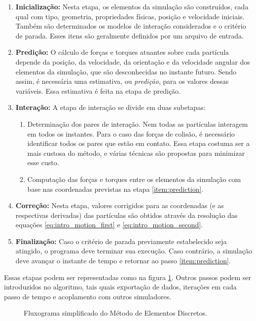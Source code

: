 \begin{enumerate} 
	\item \textbf{Inicialização:} Nesta etapa, os elementos da simulação são construídos, cada qual com tipo, geometria, propriedades físicas, posição e velocidade iniciais. Também são determinados os modelos de interação considerados e o critério de parada. Esses itens são geralmente definidos por um arquivo de entrada. 
	\item \textbf{Predição:} O cálculo de forças e torques atuantes sobre cada partícula depende da posição, da velocidade, da orientação e da velocidade angular dos elementos da simulação, que são desconhecidas no instante futuro. Sendo assim, é necessária uma estimativa, ou \textit{predição}, para os valores dessas variáveis. Essa estimativa é feita na etapa de predição. \label{item:prediction} 
	\item \textbf{Interação:} A etapa de interação se divide em duas subetapas: 
	\begin{enumerate} 
		\item Determinação dos pares de interação. Nem todas as partículas interagem em todos os instantes. Para o caso das forças de colisão, é necessário identificar todos os pares que estão em contato. Essa etapa costuma ser a mais custosa do método, e várias técnicas são propostas para minimizar esse custo. 
		\item Computação das forças e torques entre os elementos da simulação com base nas coordenadas previstas na etapa \ref{item:prediction}.
	\end{enumerate} 
	\item \textbf{Correção:} Nesta etapa, valores corrigidos para as coordenadas (e as respectivas derivadas) das partículas são obtidos através da resolução das equações \eqref{eq:intro_motion_first} e \eqref{eq:intro_motion_second}. 
	\item \textbf{Finalização:} Caso o critério de parada previamente estabelecido seja atingido, o programa deve terminar sua execução. Caso contrário, a simulação deve avançar o instante de tempo e retornar ao passo \ref{item:prediction}. 
\end{enumerate} 

Essas etapas podem ser representadas como na figura \ref{fig:simple_dem_algorithm}. Outros passos podem ser introduzidos no algoritmo, tais quais exportação de dados, iterações em cada passo de tempo e acoplamento com outros simuladores.

\begin{figure}[h]
	\caption{Fluxograma simplificado do Método de Elementos Discretos.}
	\centering
		
	\label{fig:simple_dem_algorithm}
	\sourceMe
\end{figure}

